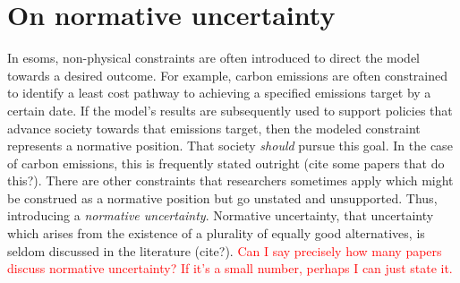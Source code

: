 \section{On normative uncertainty}
In \acp{esom}, non-physical constraints are often introduced to direct the model
towards a desired outcome. For example, carbon emissions are often constrained
to identify a least cost pathway to achieving a specified emissions target by a
certain date. If the model's results are subsequently used to support policies
that advance society towards that emissions target, then the modeled constraint
represents a normative position. That society \textit{should} pursue this goal.
In the case of carbon emissions, this is frequently stated outright (cite some
papers that do this?). There are other constraints that researchers sometimes
apply which might be construed as a normative position but go unstated and
unsupported. Thus, introducing a \textit{normative uncertainty}. Normative
uncertainty, that uncertainty which arises from the existence of a plurality of
equally good alternatives, is seldom discussed in the literature (cite?).
\textcolor{red}{Can I say precisely how many papers discuss normative
uncertainty? If it's a small number, perhaps I can just state it.}


